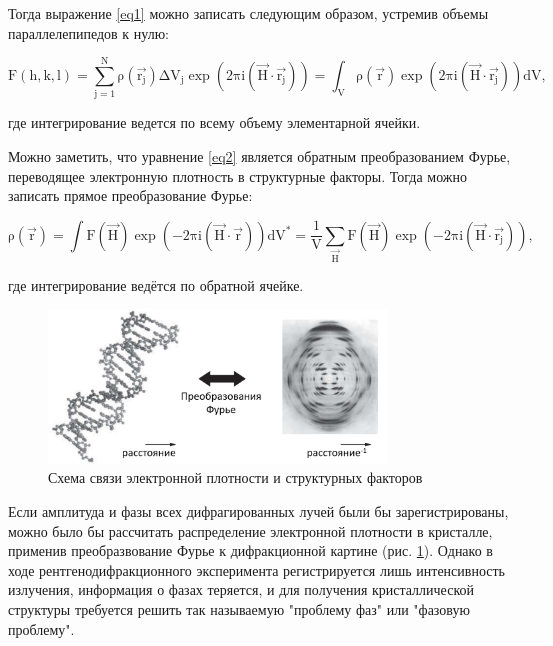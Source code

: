 Тогда выражение \ref{eq1} можно записать следующим образом, устремив объемы параллелепипедов к нулю:

\begin{equation}\label{eq2}
\mathrm{ 
F(h,k,l) = \sum\limits_{j=1}^N \rho(\overrightarrow{r_j})\Delta V_j \exp(2\pi i(\overrightarrow{H}\cdot\overrightarrow{r_j})) = \int_V\rho(\overrightarrow{r})\exp(2\pi i(\overrightarrow{H}\cdot\overrightarrow{r_j}))dV,}
\end{equation}

где интегрирование ведется по всему объему элементарной ячейки.

Можно заметить, что уравнение \ref{eq2} является обратным преобразованием Фурье, переводящее электронную плотность в структурные факторы. Тогда можно записать прямое преобразование Фурье:

\begin{equation}\label{eq21}
\mathrm{ 
\rho(\overrightarrow{r}) = \int F(\overrightarrow{H}) \exp (-2\pi i (\overrightarrow{H}\cdot\overrightarrow{r}))dV^* = \frac{1}{V} \sum\limits_{\overrightarrow{H}} F(\overrightarrow{H}) \exp(-2\pi i (\overrightarrow{H}\cdot\overrightarrow{r_j}))},
\end{equation}

где интегрирование ведётся по обратной ячейке.

\begin{figure}[H]
	\centering
	\includegraphics[width=0.8\textwidth]{figures/furie.png}\hfill
	\caption{Схема связи электронной плотности и структурных факторов \cite{girolami_x-ray_2016}}
	\label{furie}
\end{figure}


Если амплитуда и фазы всех дифрагированных лучей были бы зарегистрированы, можно было бы рассчитать распределение электронной плотности в кристалле, применив преобразвование Фурье к дифракционной картине (рис. \ref{furie}). Однако в ходе рентгенодифракционного эксперимента регистрируется лишь интенсивность излучения, информация о фазах теряется, и для получения кристаллической структуры требуется решить так называемую "проблему фаз" или "фазовую проблему".


